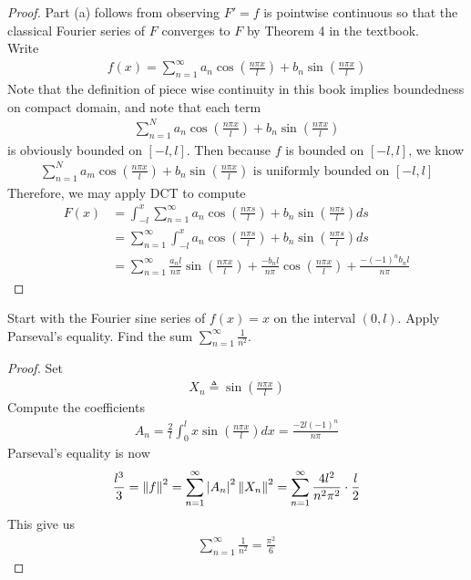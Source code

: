 \documentclass{report}
\begin{document}
\begin{proof}
Part (a) follows from observing $F'=f$ is pointwise continuous so that the classical Fourier series of $F$ converges to  $F$ by Theorem 4 in the textbook.\\

Write 
\begin{align*}
f(x)=\sum_{n=1}^{\infty} a_n\cos ( \frac{n \pi  x}{l})+ b_n \sin ( \frac{n \pi  x}{l}) 
\end{align*}
Note that the definition of piece wise continuity in this book implies boundedness on compact domain, and note that each term
\begin{align*}
\sum_{n=1}^N a_n \cos (\frac{n \pi  x}{l})+ b_n \sin (\frac{n \pi  x}{l})
\end{align*}
is obviously bounded on $[-l,l]$. Then because $f$ is bounded on $[-l,l]$, we know 
\begin{align*}
\sum_{n=1}^N a_m \cos (\frac{n \pi  x}{l})+ b_n \sin (\frac{n \pi  x}{l})\text{ is uniformly bounded on }[-l,l]
\end{align*}
Therefore, we may apply DCT to compute 
\begin{align*}
F(x)&= \int_{-l}^x \sum_{n=1}^{\infty} a_n \cos ( \frac{n \pi  s}{l})+ b_n \sin ( \frac{n \pi  s}{l})ds  \\
&=\sum_{n=1}^{\infty} \int_{-l}^x a_n \cos ( \frac{n \pi  s}{l})+ b_n \sin ( \frac{n \pi  s}{l})ds\\
&=\sum_{n=1}^{\infty} \frac{a_n l}{n \pi  }\sin ( \frac{ n \pi  x}{l}) + \frac{-b_n l}{n \pi }\cos (\frac{n \pi  x}{l})+ \frac{-(-1)^nb_nl}{n \pi }
\end{align*}
\end{proof}
\begin{question}{}{}
Start with the Fourier sine series of $f(x)=x$ on the interval $(0,l)$. Apply Parseval's equality. Find the sum $\sum_{n=1}^{\infty } \frac{1}{n^2}$. 
\end{question}
\begin{proof}
Set 
\begin{align*}
X_n\triangleq  \sin (\frac{n \pi  x}{l})
\end{align*}
Compute the coefficients 
\begin{align*}
A_n= \frac{2}{l}\int_0^l x \sin ( \frac{n \pi  x}{l})dx= \frac{-2l(-1)^n}{n \pi  }
\end{align*}
Parseval's equality is now 
\begin{align*}
 \frac{l^3}{3}=\left\| f \right\|^2= \sum_{n=1}^{\infty} \left|A_n\right|^2 \left\| X_n \right\|^2= \sum_{n=1}^{\infty} \frac{4l^2}{n^2 \pi ^2}\cdot\frac{l}{2}
\end{align*}
This give us 
\begin{align*}
\sum_{n=1}^{\infty} \frac{1}{n^2}= \frac{\pi ^2}{6}
\end{align*}
\end{proof}
\end{document}
